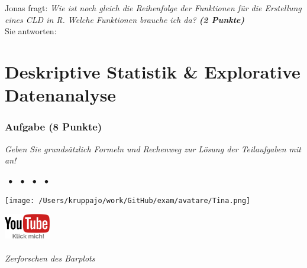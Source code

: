 \documentclass[a4paper, 9pt]{scrartcl}\usepackage[]{graphicx}\usepackage[]{xcolor}
\begin{document}
Jonas fragt: \textit{Wie ist noch gleich die Reihenfolge der Funktionen für die Erstellung eines CLD in R. Welche Funktionen brauche ich da? \textbf{(2 Punkte)}}\\[1ex]
Sie antworten:\\[6.5Ex]



 
\clearpage
\part{Deskriptive Statistik \& Explorative Datenanalyse}

\section{Aufgabe \hfill (8 Punkte)}

\textit{Geben Sie grundsätzlich Formeln und Rechenweg zur Lösung der Teilaufgaben mit an!} \\[1Ex]
 

 
\ifcollection
\begin{flushright}
\tiny\vspace{-3Ex}
\textbf{\examinhaltstart}
\exammodulemathstat $\;\bullet$
\exammodulestat $\;\bullet$
\exammodulestatbbv $\;\bullet$
\exammodulestatversuch $\;\bullet$
\exammodulebiostat
\vspace{-4Ex}
\end{flushright}
\begin{minipage}[t]{0.5\textwidth}
\texttt{[image: /Users/kruppajo/work/GitHub/exam/avatare/Tina.png]}
\end{minipage}
\begin{minipage}[t]{0.5\textwidth}
\hfill
\href{https://youtu.be/t0WYa_LVc5o}{\includegraphics[width = 2cm]{img/youtube}}
\end{minipage}
\vspace{-3ex}
\fi



\ifcollection
\paragraph{Zerforschen des Barplots}
\fi
\end{document}
